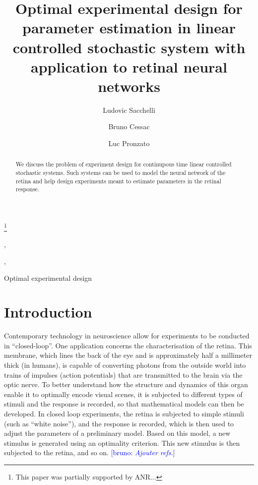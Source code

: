 \documentclass[twocolumn]{autart}
\newcommand{\B}[1]{{\textcolor{blue}{[bruno: \textit{#1}]}}}
\theoremstyle{definition}
\theoremstyle{remark}
\begin{document}
\begin{frontmatter}


\title{Optimal experimental design for parameter estimation in linear controlled stochastic system with application to retinal neural networks}

\thanks[footnoteinfo]{This paper was partially supported by ANR...}

\author[inria]{Ludovic Sacchelli},    %
\author[inria2]{Bruno Cessac},               %
\author[I3S]{Luc Pronzato}  

\address[inria]{Inria , Universit\'e C\^ote d'Azur, CNRS, LJAD, France}  
\address[inria2]{Inria}  
\address[I3S]{I3S}            


          
\begin{keyword}                           
Optimal experimental design                                      
\end{keyword}                             
                                          
                                          


\begin{abstract}                         
We discuss the problem of experiment design for continupous time linear controlled stochastic systems. Such systems can be used to model the neural network of the retina and help design experiments meant to estimate parameters in the retinal response.
\end{abstract}

\end{frontmatter}

\section{Introduction}


Contemporary technology in neuroscience allow for experiments to be conducted in “closed-loop”. One application concerns the characterisation of the retina. This membrane, which lines the back of the eye and is approximately half a millimeter thick (in humans), is capable of converting photons from the outside world into trains of impulses (action potentials) that are transmitted to the brain via the optic nerve. To better understand how the structure and dynamics of this organ enable it to optimally encode visual scenes, it is subjected to different types of stimuli and the response is recorded, so that mathematical models can then be developed. In closed loop experiments, the retina is subjected to simple stimuli (such as “white noise”), and the response is recorded, which is then used to adjust the parameters of a preliminary model. Based on this model, a new stimulus is generated using an optimality criterion. This new stimulus is then subjected to the retina, and so on. \B{Ajouter refs.}
\end{document}
